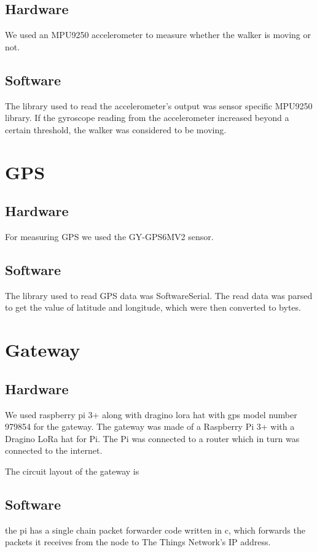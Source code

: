 	\subsection{Hardware}
	We used an MPU9250 accelerometer to measure whether the walker is moving or not.

	\subsection{Software}
	The library used to read the accelerometer's output was sensor specific MPU9250 library. If the gyroscope reading from the accelerometer increased beyond a certain threshold, the walker was considered to be moving.

\section{GPS}

	\subsection{Hardware}
	For measuring GPS we used the GY-GPS6MV2 sensor.

	\subsection{Software}
	The library used to read GPS data was SoftwareSerial. The read data was parsed to get the value of latitude and longitude, which were then converted to bytes.

\section{Gateway}
		
	\subsection{Hardware}
	We used raspberry pi 3+ along with dragino lora hat with gps model number 979854 for the gateway.
	The gateway was made of a Raspberry Pi 3+ with a Dragino LoRa hat for Pi. The Pi was connected to a router which in turn was connected to the internet.


	The circuit layout of the gateway is





	\subsection{Software}
	the pi has a single chain packet forwarder code written in c, which forwards the packets it receives from the node to The Things Network's IP address. 

